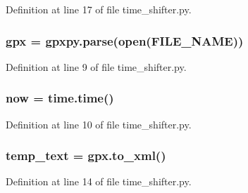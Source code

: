 Definition at line 17 of file time\+\_\+shifter.\+py.

\subsubsection[{\texorpdfstring{gpx}{gpx}}]{\setlength{\rightskip}{0pt plus 5cm}gpx = gpxpy.\+parse(open(F\+I\+L\+E\+\_\+\+N\+A\+ME))}\hypertarget{namespacetime__shifter_a701030976c24adaa37c6bbf9af499ac8}{}\label{namespacetime__shifter_a701030976c24adaa37c6bbf9af499ac8}


Definition at line 9 of file time\+\_\+shifter.\+py.

\subsubsection[{\texorpdfstring{now}{now}}]{\setlength{\rightskip}{0pt plus 5cm}now = time.\+time()}\hypertarget{namespacetime__shifter_afdc24ca189ea1f66dfd9245b4c970d59}{}\label{namespacetime__shifter_afdc24ca189ea1f66dfd9245b4c970d59}


Definition at line 10 of file time\+\_\+shifter.\+py.

\subsubsection[{\texorpdfstring{temp\+\_\+text}{temp_text}}]{\setlength{\rightskip}{0pt plus 5cm}temp\+\_\+text = gpx.\+to\+\_\+xml()}\hypertarget{namespacetime__shifter_acfe3ecceec8adb15641afbf1805061dc}{}\label{namespacetime__shifter_acfe3ecceec8adb15641afbf1805061dc}


Definition at line 14 of file time\+\_\+shifter.\+py.


